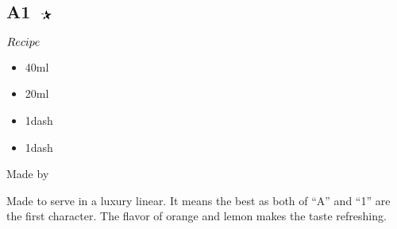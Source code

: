 \subsection{A1 $\openbigstar$}
\begin{itembox}[l]{\boldmath $Recipe$}
\begin{itemize}
\setlength{\parskip}{0cm}
\setlength{\itemsep}{0cm}
\item \gin 40ml
\item \oc 20ml
\item \lj 1dash
\item \gs 1dash
\end{itemize}
\vspace{-4mm}
Made by \shake
\end{itembox}
Made to serve in a luxury linear. It means the best as both of ``A'' and ``1'' are the first character. 
The flavor of orange and lemon makes the taste refreshing.
